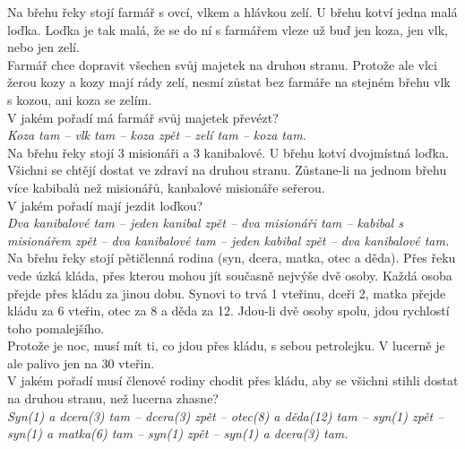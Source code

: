 \begin{multicols}{\value{columnsgames}}
\noindent
Na břehu řeky stojí farmář s ovcí, vlkem a hlávkou zelí. U břehu kotví jedna
malá loďka. Loďka je tak malá, že se do ní s farmářem vleze už buď jen koza,
jen vlk, nebo jen zelí.\\
Farmář chce dopravit všechen svůj majetek na druhou stranu. Protože ale vlci
žerou kozy a kozy mají rády zelí, nesmí zůstat bez farmáře na stejném břehu
vlk s kozou, ani koza se zelím.\\
V jakém pořadí má farmář svůj majetek převézt?\\[1 mm]
{\sl Koza tam -- vlk tam -- koza zpět -- zelí tam -- koza tam.}\\

\noindent
Na břehu řeky stojí 3 misionáři a 3 kanibalové. U břehu kotví dvojmístná
loďka. Všichni se chtějí dostat ve zdraví na druhou stranu. Zůstane-li na
jednom břehu více kabibalů než misionářů, kanbalové misionáře seřerou.\\
V jakém pořadí mají jezdit loďkou?\\[1 mm]
{\sl Dva kanibalové tam -- jeden kanibal zpět -- dva misionáři tam -- 
kabibal s misionářem zpět -- dva kanibalové tam -- jeden kabibal zpět --
dva kanibalové tam.}\\

\noindent
Na břehu řeky stojí pětičlenná rodina (syn, dcera, matka, otec a děda).
Přes řeku vede úzká kláda, přes kterou mohou jít současně nejvýše dvě osoby.
Každá osoba přejde přes kládu za jinou dobu. Synovi to trvá 1 vteřinu, dceři
2, matka přejde kládu za 6 vteřin, otec za 8 a děda za 12. Jdou-li dvě osoby
spolu, jdou rychlostí toho pomalejšího.\\
Protože je noc, musí mít ti, co jdou přes kládu, s sebou petrolejku. V lucerně
je ale palivo jen na 30 vteřin.\\
V jakém pořadí musí členové rodiny chodit přes kládu, aby se všichni stihli
dostat na druhou stranu, než lucerna zhasne?\\[1 mm]
{\sl Syn(1) a dcera(3) tam -- dcera(3) zpět -- otec(8) a děda(12) tam -- 
syn(1) zpět -- syn(1) a matka(6) tam -- syn(1) zpět -- syn(1) a dcera(3)
tam.}\\


\end{multicols}
